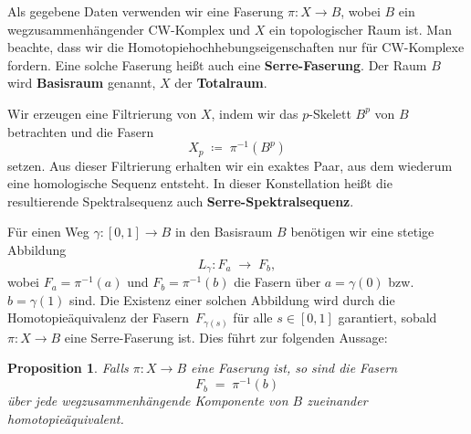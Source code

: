 \documentclass[12pt]{article}
\numberwithin{conj}{section}
\newtheorem{proposition}[conj]{Proposition}
\begin{document}
    Als gegebene Daten verwenden wir eine Faserung $\pi : X \to B$, wobei $B$ ein
    wegzusammenhängender CW-Komplex und $X$ ein topologischer Raum ist. Man beachte,
    dass wir die Homotopiehochhebungseigenschaften nur für CW-Komplexe fordern. Eine
    solche Faserung heißt auch eine \textbf{Serre-Faserung}. Der Raum $B$ wird \textbf{Basisraum}
    genannt, $X$ der \textbf{Totalraum}.

    Wir erzeugen eine Filtrierung von $X$, indem wir das $p$-Skelett $B^{p}$ von $B$
    betrachten und die Fasern
    \[
        X_{p} \;\coloneqq\; \pi^{-1}(B^{p})
    \]
    setzen. Aus dieser Filtrierung erhalten wir ein exaktes Paar, aus dem wiederum
    eine homologische Sequenz entsteht. In dieser Konstellation heißt die
    resultierende Spektralsequenz auch \textbf{Serre-Spektralsequenz}.

    \smallskip

    Für einen Weg $\gamma: [0,1] \to B$ in den Basisraum $B$ benötigen wir eine
    stetige Abbildung
    \[
        L_{\gamma} : F_{a} \;\longrightarrow\; F_{b},
    \]
    wobei $F_{a} = \pi^{-1}(a)$ und $F_{b} = \pi^{-1}(b)$ die Fasern über
    $a = \gamma(0)$ bzw.\ $b = \gamma(1)$ sind. Die Existenz einer solchen
    Abbildung wird durch die Homotopieäquivalenz der Fasern $\,F_{\gamma(s)}$ für
    alle $s\in[0,1]$ garantiert, sobald $\pi : X \to B$ eine Serre-Faserung ist.
    Dies führt zur folgenden Aussage:

    \begin{proposition}
        Falls $\pi : X \to B$ eine Faserung ist, so sind die Fasern
        \[
            F_{b} \;=\; \pi^{-1}(b)
        \]
        über jede wegzusammenhängende Komponente von $B$ zueinander
        homotopieäquivalent.
    \end{proposition}
\end{document}

